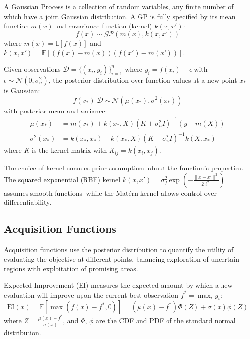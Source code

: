 \begin{definition}
\label{def:gp}
A Gaussian Process is a collection of random variables, any finite number of which have a joint Gaussian distribution. A GP is fully specified by its mean function $m(x)$ and covariance function (kernel) $k(x, x')$:
\begin{equation}
f(x) \sim \mathcal{GP}(m(x), k(x, x'))
\end{equation}
where $m(x) = \mathbb{E}[f(x)]$ and $k(x, x') = \mathbb{E}[(f(x) - m(x))(f(x') - m(x'))]$.
\end{definition}

Given observations $\mathcal{D} = \{(x_i, y_i)\}_{i=1}^{n}$ where $y_i = f(x_i) + \epsilon$ with $\epsilon \sim \mathcal{N}(0, \sigma^2_n)$, the posterior distribution over function values at a new point $x_*$ is Gaussian:
\begin{equation}
f(x_*) | \mathcal{D} \sim \mathcal{N}(\mu(x_*), \sigma^2(x_*))
\end{equation}
with posterior mean and variance:
\begin{align}
\mu(x_*) &= m(x_*) + k(x_*, X)(K + \sigma^2_n I)^{-1}(y - m(X)) \\
\sigma^2(x_*) &= k(x_*, x_*) - k(x_*, X)(K + \sigma^2_n I)^{-1}k(X, x_*)
\end{align}
where $K$ is the kernel matrix with $K_{ij} = k(x_i, x_j)$.

The choice of kernel encodes prior assumptions about the function's properties. The squared exponential (RBF) kernel $k(x, x') = \sigma^2_f \exp\left(-\frac{\|x-x'\|^2}{2\ell^2}\right)$ assumes smooth functions, while the Mat\'{e}rn kernel allows control over differentiability.

\subsection{Acquisition Functions}
\label{subsec:acquisition_functions}

Acquisition functions use the posterior distribution to quantify the utility of evaluating the objective at different points, balancing exploration of uncertain regions with exploitation of promising areas.

\begin{definition}
\label{def:ei}
Expected Improvement (EI) measures the expected amount by which a new evaluation will improve upon the current best observation $f^* = \max_{i} y_i$:
\begin{equation}
\text{EI}(x) = \mathbb{E}[\max(f(x) - f^*, 0)] = (μ(x) - f^*)\Phi(Z) + \sigma(x)\phi(Z)
\end{equation}
where $Z = \frac{\mu(x) - f^*}{\sigma(x)}$, and $\Phi$, $\phi$ are the CDF and PDF of the standard normal distribution.
\end{definition}


